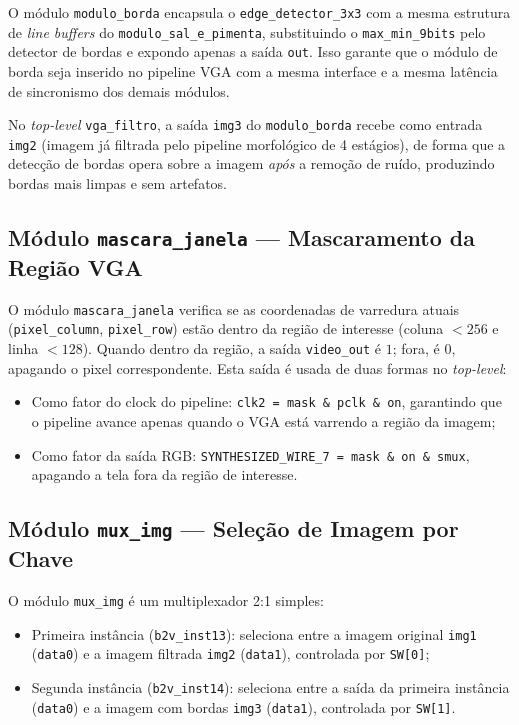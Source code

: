 \documentclass[12pt, a4paper]{article}
\begin{document}
	O módulo \texttt{modulo\_borda} encapsula o \texttt{edge\_detector\_3x3} com a
	mesma estrutura de \textit{line buffers} do \texttt{modulo\_sal\_e\_pimenta},
	substituindo o \texttt{max\_min\_9bits} pelo detector de bordas e expondo apenas
	a saída \texttt{out}. Isso garante que o módulo de borda seja inserido no
	pipeline VGA com a mesma interface e a mesma latência de sincronismo dos demais
	módulos.
	
	No \textit{top-level} \texttt{vga\_filtro}, a saída \texttt{img3} do
	\texttt{modulo\_borda} recebe como entrada \texttt{img2} (imagem já filtrada pelo
	pipeline morfológico de 4 estágios), de forma que a detecção de bordas opera
	sobre a imagem \textit{após} a remoção de ruído, produzindo bordas mais limpas
	e sem artefatos.
	
	\subsection{Módulo \texttt{mascara\_janela} --- Mascaramento da Região VGA}
	
	O módulo \texttt{mascara\_janela} verifica se as coordenadas de varredura atuais
	(\texttt{pixel\_column}, \texttt{pixel\_row}) estão dentro da região de interesse
	(coluna $< 256$ e linha $< 128$). Quando dentro da região, a saída \texttt{video\_out}
	é $1$; fora, é $0$, apagando o pixel correspondente. Esta saída é usada de duas
	formas no \textit{top-level}:
	
	\begin{itemize}
		\item Como fator do clock do pipeline: \texttt{clk2 = mask \& pclk \& on},
		garantindo que o pipeline avance apenas quando o VGA está varrendo a
		região da imagem;
		\item Como fator da saída RGB: \texttt{SYNTHESIZED\_WIRE\_7 = mask \& on \& smux},
		apagando a tela fora da região de interesse.
	\end{itemize}
	
	\subsection{Módulo \texttt{mux\_img} --- Seleção de Imagem por Chave}
	
	O módulo \texttt{mux\_img} é um multiplexador 2:1 simples:
	
	\begin{itemize}
		\item Primeira instância (\texttt{b2v\_inst13}): seleciona entre a imagem
		original \texttt{img1} (\texttt{data0}) e a imagem filtrada \texttt{img2}
		(\texttt{data1}), controlada por \texttt{SW[0]};
		\item Segunda instância (\texttt{b2v\_inst14}): seleciona entre a saída da
		primeira instância (\texttt{data0}) e a imagem com bordas \texttt{img3}
		(\texttt{data1}), controlada por \texttt{SW[1]}.
	\end{itemize}
	
\end{document}
